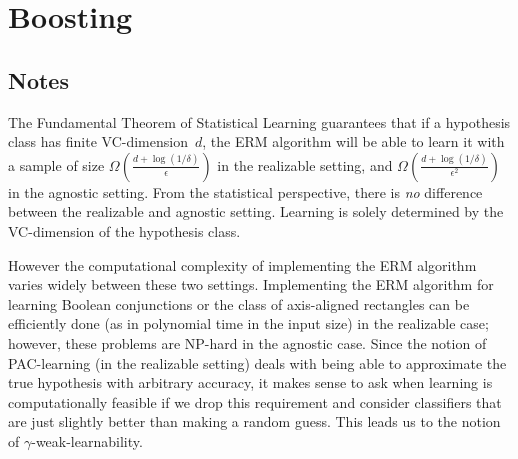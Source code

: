 \chapter{Boosting}

\section{Notes}

The Fundamental Theorem of Statistical Learning guarantees that if a hypothesis
class has finite VC-dimension~$d$, the ERM algorithm will be able to
learn it with a sample of size $\Omega(\frac{d + \log (1 / \delta)}{\epsilon})$
in the realizable setting, and $\Omega(\frac{d + \log (1 /
\delta)}{\epsilon^2})$ in the agnostic setting. From the statistical
perspective, there is \emph{no} difference between the realizable and agnostic
setting. Learning is solely determined by the VC-dimension of the hypothesis
class.

However the computational complexity of implementing the ERM algorithm varies
widely between these two settings. Implementing the ERM algorithm for learning
Boolean conjunctions or the class of axis-aligned rectangles can be efficiently
done (as in polynomial time in the input size) in the realizable case; however,
these problems are NP-hard in the agnostic case. Since the notion of
PAC-learning (in the realizable setting) deals with being able to approximate
the true hypothesis with arbitrary accuracy, it makes sense to ask when
learning is computationally feasible if we drop this requirement and consider
classifiers that are just slightly better than making a random guess.  This
leads us to the notion of $\gamma$-weak-learnability.

\begin{definition}

\end{definition}
